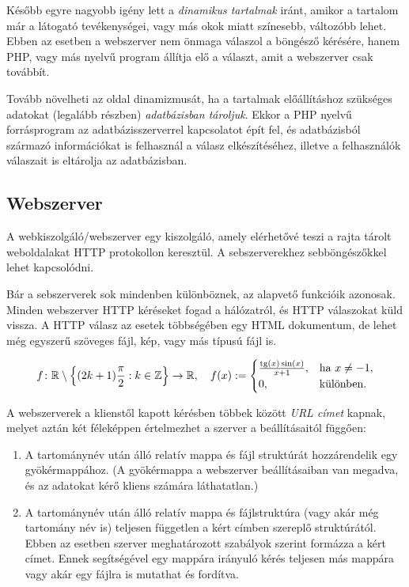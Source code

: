 \documentclass[12pt,twoside]{report}
\DeclareMathOperator{\tg}{tg}
\theoremstyle{definition}
\begin{document}
Később egyre nagyobb igény lett a \emph{dinamikus tartalmak} iránt, amikor a tartalom már a látogató tevékenységei, vagy más okok miatt színesebb, változóbb lehet. Ebben az esetben a webszerver nem önmaga válaszol a böngésző kérésére, hanem PHP, vagy más nyelvű program állítja elő a választ, amit a webszerver csak továbbít.

Tovább növelheti az oldal dinamizmusát, ha a tartalmak előállításhoz szükséges adatokat (legalább részben) \emph{adatbázisban tároljuk}. Ekkor a PHP nyelvű forrásprogram az adatbázisszerverrel kapcsolatot épít fel, és adatbázisból származó információkat is felhasznál a válasz elkészítéséhez, illetve a felhasználók válaszait is eltárolja az adatbázisban.
\subsection{Webszerver}
A webkiszolgáló/webszerver egy kiszolgáló, amely elérhetővé teszi a rajta tárolt weboldalakat HTTP protokollon keresztül. A sebszerverekhez sebböngészőkkel lehet kapcsolódni.

Bár a sebszerverek sok mindenben különböznek, az alapvető funkcióik azonosak. Minden webszerver HTTP kéréseket fogad a hálózatról, és HTTP válaszokat küld vissza. A HTTP válasz az esetek többségében egy HTML dokumentum, de lehet még egyszerű szöveges fájl, kép, vagy más típusú fájl is.

\begin{equation}\label{eq:keplet}
f\colon\mathbb{R}\setminus\Bigl\{(2k+1)\frac{\pi}{2}:k\in\mathbb{Z}\Bigr\}\to\mathbb{R},\quad f(x):=
\begin{cases}
\frac{\tg(x)\sin(x)}{x+1},&\text{ha }x\ne -1,\\
0,&\text{különben.}
\end{cases}
\end{equation}

A webszerverek a klienstől kapott kérésben többek között \emph{URL címet} kapnak, melyet aztán két féleképpen értelmezhet a szerver a beállításaitól függően:
\begin{enumerate}
	\item A tartománynév után álló relatív mappa és fájl struktúrát hozzárendelik egy gyökérmappához. (A gyökérmappa a webszerver beállításaiban van megadva, és az adatokat kérő kliens számára láthatatlan.)
	\item A tartománynév után álló relatív mappa és fájlstruktúra (vagy akár még tartomány név is) teljesen független a kért címben szereplő struktúrától. Ebben az esetben szerver meghatározott szabályok szerint formázza a kért címet. Ennek segítségével egy mappára irányuló kérés teljesen más mappára vagy akár egy fájlra is mutathat és fordítva.
\end{enumerate}
\end{document}
